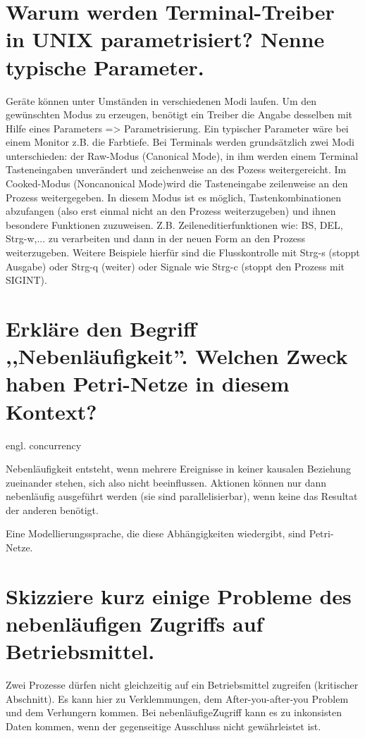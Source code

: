 \documentclass[12pt,a4paper,ngerman]{scrartcl}
\newcommand{\question}[1]{#1}
\newenvironment {answer}
                {}
                {}
\begin{document}
\section{\question{Warum werden Terminal-Treiber in UNIX parametrisiert? Nenne typische Parameter.}}
\begin{answer}
Geräte können unter Umständen in verschiedenen Modi laufen. Um den gewünschten Modus zu
erzeugen, benötigt ein Treiber die Angabe desselben mit Hilfe eines Parameters => Parametrisierung.
Ein typischer Parameter wäre bei einem Monitor z.B. die Farbtiefe.
Bei Terminals werden grundsätzlich zwei Modi unterschieden: der Raw-Modus (Canonical Mode),
in ihm werden einem Terminal Tasteneingaben unverändert und zeichenweise an des Pozess
weitergereicht. Im Cooked-Modus (Noncanonical Mode)wird die Tasteneingabe zeilenweise an den
Prozess weitergegeben. In diesem Modus ist es möglich, Tastenkombinationen abzufangen (also
erst einmal nicht an den Prozess weiterzugeben) und ihnen besondere Funktionen zuzuweisen.
Z.B. Zeileneditierfunktionen wie: BS, DEL, Strg-w,... zu verarbeiten und dann in der neuen Form
an den Prozess weiterzugeben. Weitere Beispiele hierfür sind die Flusskontrolle mit Strg-s (stoppt
Ausgabe) oder Strg-q (weiter) oder Signale wie Strg-c (stoppt den Prozess mit SIGINT).
\end{answer}

\section{\question{Erkläre den Begriff ,,Nebenläufigkeit''. Welchen Zweck haben Petri-Netze in diesem Kontext?}}
\begin{answer}
engl. concurrency

Nebenläufigkeit entsteht, wenn mehrere Ereignisse in keiner kausalen Beziehung zueinander stehen, sich also nicht beeinflussen. Aktionen können nur dann nebenläufig ausgeführt werden (sie sind parallelisierbar), wenn keine das Resultat der anderen benötigt.

Eine Modellierungssprache, die diese Abhängigkeiten wiedergibt, sind Petri-Netze.
\end{answer}

\section{\question{Skizziere kurz einige Probleme des nebenläufigen Zugriffs auf Betriebsmittel.}}
\begin{answer}
Zwei Prozesse dürfen nicht gleichzeitig auf ein Betriebsmittel zugreifen (kritischer Abschnitt). Es
kann hier zu Verklemmungen, dem After-you-after-you Problem und dem Verhungern kommen.
Bei nebenläufigeZugriff kann es zu inkonsisten Daten kommen, wenn der gegenseitige Ausschluss
nicht gewährleistet ist.
\end{answer}
\end{document}
